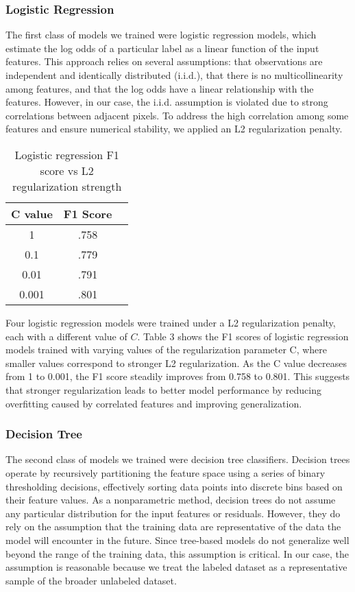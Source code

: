 \documentclass[11pt,letterpaper]{article}
\begin{document}
\subsubsection{Logistic Regression}
The first class of models we trained were logistic regression models, which estimate the log odds of a particular label as a linear function of the input features. This approach relies on several assumptions: that observations are independent and identically distributed (i.i.d.), that there is no multicollinearity among features, and that the log odds have a linear relationship with the features. However, in our case, the i.i.d. assumption is violated due to strong correlations between adjacent pixels. To address the high correlation among some features and ensure numerical stability, we applied an L2 regularization penalty.

\begin{center}
\begin{table}[H]
\centering
\caption{Logistic regression F1 score vs L2 regularization strength}
\renewcommand{\arraystretch}{1.25}
\begin{tabular}{|c|c|c|}
\hline
C value &  F1 Score \\ \hline
1 & .758 \\ \hline
0.1 & .779 \\ \hline
0.01 & .791 \\ \hline
0.001 & .801 \\ \hline
\end{tabular}
\end{table}
\end{center}

Four logistic regression models were trained under a L2 regularization penalty, each with a different value of $C$. Table 3 shows the F1 scores of logistic regression models trained with varying values of the regularization parameter C, where smaller values correspond to stronger L2 regularization. As the C value decreases from 1 to 0.001, the F1 score steadily improves from 0.758 to 0.801. This suggests that stronger regularization leads to better model performance by reducing overfitting caused by correlated features and improving generalization.

\subsubsection{Decision Tree}
The second class of models we trained were decision tree classifiers. Decision trees operate by recursively partitioning the feature space using a series of binary thresholding decisions, effectively sorting data points into discrete bins based on their feature values. As a nonparametric method, decision trees do not assume any particular distribution for the input features or residuals. However, they do rely on the assumption that the training data are representative of the data the model will encounter in the future. Since tree-based models do not generalize well beyond the range of the training data, this assumption is critical. In our case, the assumption is reasonable because we treat the labeled dataset as a representative sample of the broader unlabeled dataset. 
\end{document}
